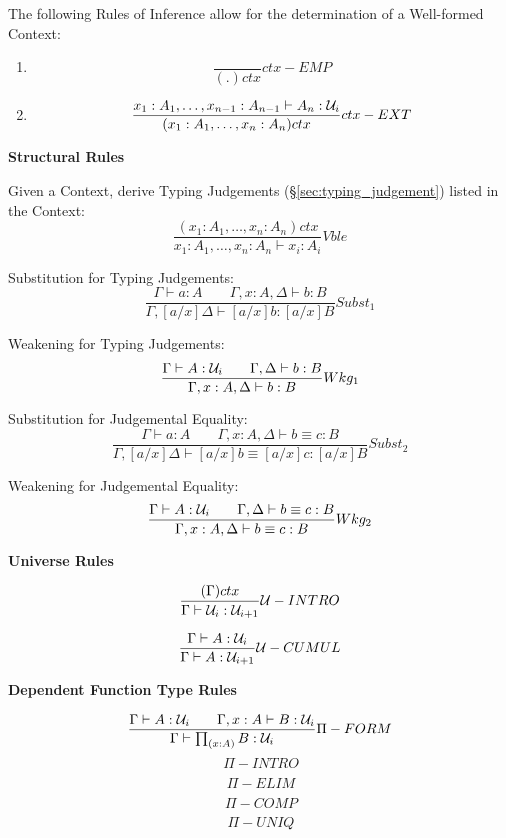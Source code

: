 The following Rules of Inference allow for the determination of a
Well-formed Context:
\begin{enumerate}
\item
\[
  {
    \frac{}{(.)ctx}
  } ctx-EMP
\]
\item
\[
  {
    \frac
    {x_1:A_1, \ldots, x_{n-1}:A_{n-1} \vdash A_n : \mathcal{U}_i}
    {(x_1:A_1,\ldots,x_n:A_n) ctx}
  } ctx-EXT
\]
\end{enumerate}



\textbf{Structural Rules}

Given a Context, derive Typing Judgements
(\S\ref{sec:typing_judgement}) listed in the Context:
\[
  {
    \frac
    {(x_1:A_1, \ldots, x_n:A_n)ctx}
    {x_1:A_1, \ldots, x_n:A_n \vdash x_i:A_i}
  } Vble
\]

Substitution for Typing Judgements:
\[
  {
    \frac
    {\Gamma \vdash a : A \;\;\;\;\;\;\;
    \Gamma,x:A,\Delta \vdash b : B}
    {\Gamma,[a/x]\Delta \vdash [a/x]b : [a/x]B}
  } Subst_1
\]

Weakening for Typing Judgements:
\[
  {
    \frac
    {\Gamma \vdash A : \mathcal{U}_i \;\;\;\;\;\;\;
    \Gamma,\Delta \vdash b : B}
    {\Gamma,x:A,\Delta \vdash b:B}
  } Wkg_1
\]

Substitution for Judgemental Equality:
\[
  {
    \frac
    {\Gamma \vdash a : A \;\;\;\;\;\;\;
    \Gamma,x:A,\Delta \vdash b \equiv c : B}
    {\Gamma,[a/x]\Delta \vdash [a/x]b \equiv [a/x]c : [a/x]B}
  } Subst_2
\]

Weakening for Judgemental Equality:
\[
  {
    \frac
    {\Gamma \vdash A : \mathcal{U}_i \;\;\;\;\;\;\;
    \Gamma,\Delta \vdash b \equiv c : B}
    {\Gamma, x:A, \Delta \vdash b \equiv c : B}
  } Wkg_2
\]



\textbf{Universe Rules}

\[
  {
    \frac
    {(\Gamma) ctx}
    {\Gamma \vdash \mathcal{U}_i : \mathcal{U}_{i+1}}
  } \mathcal{U}-INTRO
\]

\[
  {
    \frac
    {\Gamma \vdash A : \mathcal{U}_i}
    {\Gamma \vdash A : \mathcal{U}_{i+1}}
  } \mathcal{U}-CUMUL
\]



\textbf{Dependent Function Type Rules}

\[
  {
    \frac
    {\Gamma \vdash A : \mathcal{U}_i \;\;\;\;\;\;\;
    \Gamma,x:A \vdash B : \mathcal{U}_i}
    {\Gamma \vdash \prod_{(x:A)} B : \mathcal{U}_i}
  } \Pi-FORM
\]\[
  {
    \frac
    {}
    {}
  } \Pi-INTRO
\]\[
  {
    \frac
    {}
    {}
  } \Pi-ELIM
\]\[
  {
    \frac
    {}
    {}
  } \Pi-COMP
\]\[
  {
    \frac
    {}
    {}
  } \Pi-UNIQ
\]



